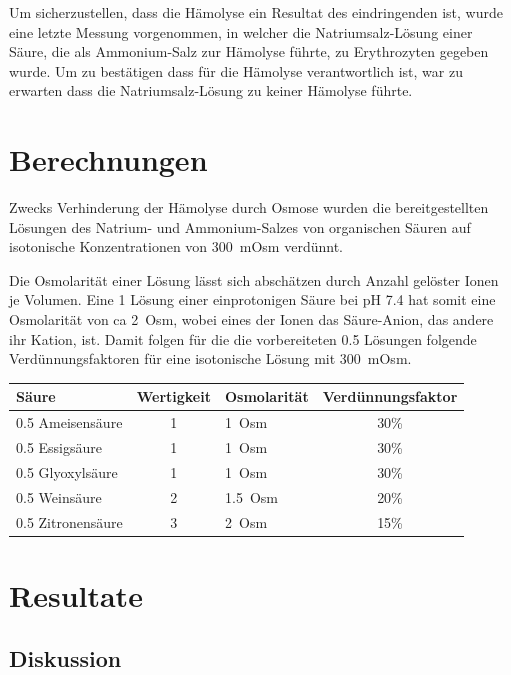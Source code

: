 \documentclass[a4paper,german]{scrreprt}
\begin{document}
Um sicherzustellen, dass die Hämolyse ein Resultat des eindringenden 
ist, wurde eine letzte Messung vorgenommen, in welcher die Natriumsalz-Lösung
einer Säure, die als Ammonium-Salz zur Hämolyse führte, zu Erythrozyten
gegeben wurde. Um zu bestätigen dass  für die Hämolyse verantwortlich
ist, war zu erwarten dass die Natriumsalz-Lösung zu keiner Hämolyse führte.

\chapter{Berechnungen}

Zwecks Verhinderung der Hämolyse durch Osmose wurden die bereitgestellten
Lösungen des Natrium- und Ammonium-Salzes von organischen Säuren auf
isotonische Konzentrationen von \SI{300}{mOsm} verdünnt.

Die Osmolarität einer Lösung lässt sich abschätzen durch Anzahl gelöster Ionen
je Volumen. Eine \SI{1}{\Molar} Lösung einer einprotonigen Säure bei \si{pH}
7.4 hat somit eine Osmolarität von ca \SI{2}{Osm}, wobei eines der Ionen das
Säure-Anion, das andere ihr Kation, ist. Damit folgen für die die
vorbereiteten \SI{0.5}{\Molar} Lösungen folgende Verdünnungsfaktoren für eine
isotonische Lösung mit \SI{300}{mOsm}.
\\

\begin{tabu}{lclc}
	\toprule
	Säure & Wertigkeit & Osmolarität & Verdünnungsfaktor \\
	\midrule
	\SI{0.5}{\Molar} Ameisensäure  & 1 & \SI{1}{Osm}   & 30\% \\
	\SI{0.5}{\Molar} Essigsäure    & 1 & \SI{1}{Osm}   & 30\% \\
	\SI{0.5}{\Molar} Glyoxylsäure  & 1 & \SI{1}{Osm}   & 30\% \\
	\SI{0.5}{\Molar} Weinsäure     & 2 & \SI{1.5}{Osm} & 20\% \\
	\SI{0.5}{\Molar} Zitronensäure & 3 & \SI{2}{Osm}   & 15\% \\
	\bottomrule
\end{tabu}

\chapter{Resultate}

\section{Diskussion}
\end{document}
